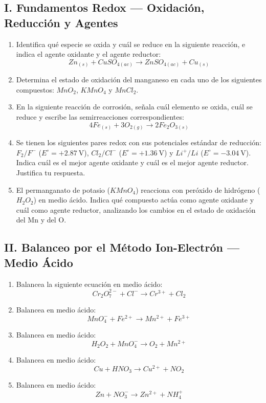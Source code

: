 \documentclass[letterpaper, 12pt, twoside]{article}
\begin{document}
\subsection*{I. Fundamentos Redox — Oxidación, Reducción y Agentes}

\begin{enumerate}[label=\textbf{\arabic*.}, itemsep=2.5em, leftmargin=*]

\item Identifica qué especie se oxida y cuál se reduce en la siguiente reacción, e indica el agente oxidante y el agente reductor:
\[ Zn_{(s)} + CuSO_{4(ac)} \rightarrow ZnSO_{4(ac)} + Cu_{(s)} \]

\item Determina el estado de oxidación del manganeso en cada uno de los siguientes compuestos: $MnO_2$, $KMnO_4$ y $MnCl_2$.

\item En la siguiente reacción de corrosión, señala cuál elemento se oxida, cuál se reduce y escribe las semirreacciones correspondientes:
\[ 4Fe_{(s)} + 3O_{2(g)} \rightarrow 2Fe_2O_{3(s)} \]

\item Se tienen los siguientes pares redox con sus potenciales estándar de reducción: $F_2/F^-$ ($E^\circ = +2.87\ \text{V}$), $Cl_2/Cl^-$ ($E^\circ = +1.36\ \text{V}$) y $Li^+/Li$ ($E^\circ = -3.04\ \text{V}$). Indica cuál es el mejor agente oxidante y cuál es el mejor agente reductor. Justifica tu respuesta.

\item El permanganato de potasio ($KMnO_4$) reacciona con peróxido de hidrógeno ($H_2O_2$) en medio ácido. Indica qué compuesto actúa como agente oxidante y cuál como agente reductor, analizando los cambios en el estado de oxidación del Mn y del O.

\end{enumerate}
\newpage
\subsection*{II. Balanceo por el Método Ion-Electrón — Medio Ácido}

\begin{enumerate}[label=\textbf{\arabic*.}, start=6, itemsep=2.5em, leftmargin=*]

\item Balancea la siguiente ecuación en medio ácido:
\[ Cr_2O_7^{2-} + Cl^- \rightarrow Cr^{3+} + Cl_2 \]

\item Balancea en medio ácido:
\[ MnO_4^- + Fe^{2+} \rightarrow Mn^{2+} + Fe^{3+} \]

\item Balancea en medio ácido:
\[ H_2O_2 + MnO_4^- \rightarrow O_2 + Mn^{2+} \]

\item Balancea en medio ácido:
\[ Cu + HNO_3 \rightarrow Cu^{2+} + NO_2 \]

\item Balancea en medio ácido:
\[ Zn + NO_3^- \rightarrow Zn^{2+} + NH_4^+ \]

\end{enumerate}
\end{document}
